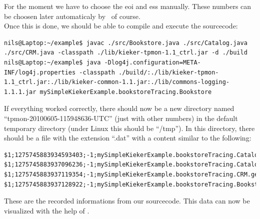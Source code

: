 \documentclass[a4paper, oneside, 11pt]{scrartcl}
\begin{document}
For the moment we have to choose the eoi and ess manually. These numbers can be choosen later automaticaly by \Kieker\ of course.\\
Once this is done, we should be able to compile and execute the sourcecode:
\setBashListing
\begin{lstlisting}
nils@Laptop:~/example$ javac ./src/Bookstore.java ./src/Catalog.java ./src/CRM.java -classpath ./lib/kieker-tpmon-1.1_ctrl.jar -d ./build
nils@Laptop:~/example$ java -Dlog4j.configuration=META-INF/log4j.properties -classpath ./build/:./lib/kieker-tpmon-1.1_ctrl.jar:./lib/kieker-common-1.1.jar:./lib/commons-logging-1.1.1.jar mySimpleKiekerExample.bookstoreTracing.Bookstore
\end{lstlisting}
If everything worked correctly, there should now be a new directory named ``tpmon-20100605-115948636-UTC'' (just with other numbers) in the default temporary directory (under Linux this should be ``/tmp''). In this directory, there should be a file with the extension ``.dat'' with a content similar to the following:
\begin{lstlisting}
$1;1275745883934593403;-1;mySimpleKiekerExample.bookstoreTracing.Catalog.getBook(false);sessionID;0;1275745883931011663;1275745883933424540;vnName;1;1
$1;1275745883937096236;-1;mySimpleKiekerExample.bookstoreTracing.Catalog.getBook(false);sessionID;0;1275745883935003302;1275745883937075214;vnName;3;2
$1;1275745883937119354;-1;mySimpleKiekerExample.bookstoreTracing.CRM.getOffers();sessionID;0;1275745883934661568;1275745883937111043;vnName;2;1
$1;1275745883937128922;-1;mySimpleKiekerExample.bookstoreTracing.Bookstore.searchBook();sessionID;0;1275745883931007961;1275745883937123824;vnName;0;0 
\end{lstlisting}
These are the recorded informations from our sourcecode. This data can now be visualized with the help of \Kieker.
\end{document}
